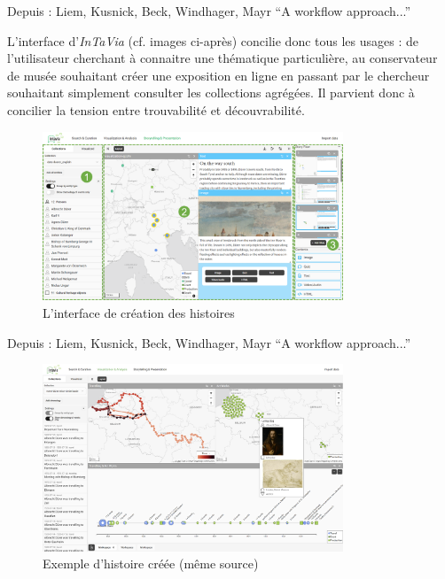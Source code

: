 \begin{center}
	Depuis : Liem, Kusnick, Beck, Windhager, Mayr \enquote{A workflow approach...}
\end{center}

L’interface d’\textit{InTaVia} (cf. images ci-après) concilie donc tous les usages : de l’utilisateur cherchant à connaitre une thématique particulière, au conservateur de musée souhaitant créer une exposition en ligne en passant par le chercheur souhaitant simplement consulter les collections agrégées. Il parvient donc à concilier la tension entre trouvabilité et découvrabilité.


\begin{figure}[h!]
	\centering
	\includegraphics[width=0.8\textwidth]{images/image19.png}
	\caption{L’interface de création des histoires}
	\label{fig:image19}
\end{figure}
 
\begin{center}
	Depuis : Liem, Kusnick, Beck, Windhager, Mayr \enquote{A workflow approach...}
\end{center}




\begin{figure}[h!]
	\centering
	\includegraphics[width=0.8\textwidth]{images/image20.png}
	\caption{Exemple d'histoire créée (même source)}
	\label{fig:image20}
\end{figure}


